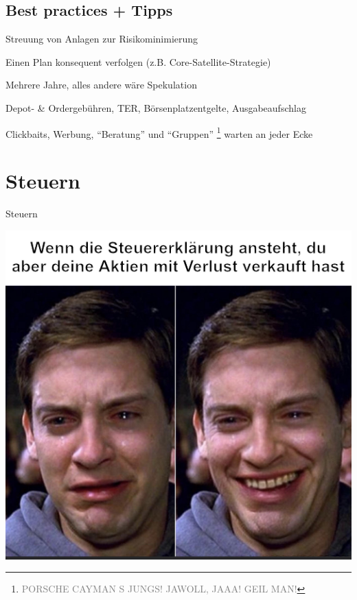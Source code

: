 \documentclass{beamer}
\let\oldfootnote\footnote
\renewcommand{\footnote}[1]
{%
	\oldfootnote
	{
		\tiny
		\textcolor{gray}{#1}
	}%
}
\begin{document}
		\subsection{Best practices + Tipps}
		
			\begin{frame}
				\begin{description}[labelwidth=0cm]
					\item[Diversifikation] Streuung von Anlagen zur Risikominimierung
					\item[Strategie] Einen Plan konsequent verfolgen (z.B. Core-Satellite-Strategie)
					\item[Geduld] Mehrere Jahre, alles andere wäre Spekulation
					\item[Gebühren] Depot- \& Ordergebühren, TER, Börsenplatzentgelte, Ausgabeaufschlag
					\item[Nachdenken] Clickbaits, Werbung, "`Beratung"' und "`Gruppen"'\footnote{PORSCHE CAYMAN S JUNGS! JAWOLL, JAAA! GEIL MAN!} warten an jeder Ecke
				\end{description}
			\end{frame}
	
	\section{Steuern}
	
		\begin{frame}
		\end{frame}
	
		\begin{frame}{Steuern}
			\begin{center}
				\vspace{-0.5cm}
				\includegraphics[height=0.85\textheight]{images/taxes-peter-parker}
			\end{center}
		\end{frame}
	
\end{document}
